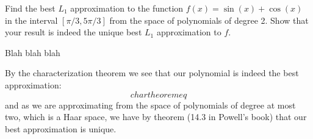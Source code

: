\begin{problem}
Find the best $L_1$ approximation to the function $f(x) = \sin(x) + \cos(x)$ in the interval $[\pi/3, 5\pi/3]$ from the space of polynomials of degree 2. Show that your result is indeed the unique best $L_1$ approximation to $f$.
\end{problem}

\begin{solution}
Blah blah blah

By the characterization theorem we see that our polynomial is indeed the best approximation:
\begin{equation*}
char theorem eq
\end{equation*}
and as we are approximating from the space of polynomials of degree at most two, which is a Haar space, we have by theorem (14.3 in Powell's book) that our best approximation is unique.
\end{solution}

